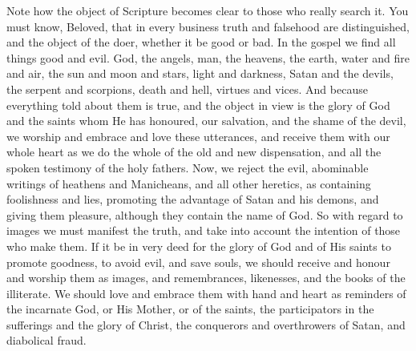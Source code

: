 \documentclass[10pt]{book}
\newcommand{\switchgreek}[1][]{\selectlanguage{polutonikogreek} \switchcolumn*[#1]}
\begin{document}
\begin{paracol}{2}
Note how the object of Scripture becomes 
clear to those who really search it. You must 
know, Beloved, that in every business truth and 
falsehood are distinguished, and the object of 
the doer, whether it be good or bad. In the 
gospel we find all things good and evil. God, 
the angels, man, the heavens, the earth, water 
and fire and air, the sun and moon and stars, 
light and darkness, Satan and the devils, the 
serpent and scorpions, death and hell, virtues 
and vices. And because everything told about 
them is true, and the object in view is the glory 
of God and the saints whom He has honoured, 
our salvation, and the shame of the devil, we 
worship and embrace and love these utterances, 
and receive them with our whole heart as we 
do the whole of the old and new dispensation, 
and all the spoken testimony of the holy 
fathers. Now, we reject the evil, abominable 
writings of heathens and Manicheans, and all 
other heretics, as containing foolishness and 
lies, promoting the advantage of Satan and his 
demons, and giving them pleasure, although 
they contain the name of God. So with regard 
to images we must manifest the truth, and take 
into account the intention of those who make 
them. If it be in very deed for the glory of 
God and of His saints to promote goodness, 
to avoid evil, and save souls, we should receive 
and honour and worship them as images, and 
remembrances, likenesses, and the books of the 
illiterate. We should love and embrace them 
with hand and heart as reminders of the 
incarnate God, or His Mother, or of the saints, 
the participators in the sufferings and the glory 
of Christ, the conquerors and overthrowers of 
Satan, and diabolical fraud.

\switchgreek


\end{paracol}
\end{document}
